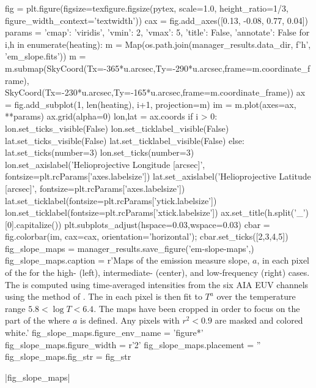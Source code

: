 \begin{pycode}
fig = plt.figure(figsize=texfigure.figsize(pytex, scale=1.0, height_ratio=1/3,
                                           figure_width_context='textwidth'))
cax = fig.add_axes([0.13, -0.08, 0.77, 0.04])
params = {'cmap': 'viridis', 'vmin': 2, 'vmax': 5, 'title': False, 'annotate': False}
for i,h in enumerate(heating):
    m = Map(os.path.join(manager_results.data_dir, f'{h}', 'em_slope.fits'))
    m = m.submap(SkyCoord(Tx=-365*u.arcsec,Ty=-290*u.arcsec,frame=m.coordinate_frame),
                 SkyCoord(Tx=-230*u.arcsec,Ty=-165*u.arcsec,frame=m.coordinate_frame))
    ax = fig.add_subplot(1, len(heating), i+1, projection=m)
    im = m.plot(axes=ax, **params)
    ax.grid(alpha=0)
    lon,lat = ax.coords
    if i > 0:
        lon.set_ticks_visible(False)
        lon.set_ticklabel_visible(False)
        lat.set_ticks_visible(False)
        lat.set_ticklabel_visible(False)
    else:
        lat.set_ticks(number=3)
        lon.set_ticks(number=3)
        lon.set_axislabel('Helioprojective Longitude [arcsec]',
                          fontsize=plt.rcParams['axes.labelsize'])
        lat.set_axislabel('Helioprojective Latitude [arcsec]',
                          fontsize=plt.rcParams['axes.labelsize'])
        lat.set_ticklabel(fontsize=plt.rcParams['ytick.labelsize'])
        lon.set_ticklabel(fontsize=plt.rcParams['xtick.labelsize'])
    ax.set_title(h.split('_')[0].capitalize())
plt.subplots_adjust(hspace=0.03,wspace=0.03)
cbar = fig.colorbar(im, cax=cax, orientation='horizontal');
cbar.set_ticks([2,3,4,5])
fig_slope_maps = manager_results.save_figure('em-slope-maps',)
fig_slope_maps.caption = r'Maps of the emission measure slope, $a$, in each pixel of the \AR{} for the high- (left), intermediate- (center), and low-frequency (right) cases. The \dem{} is computed using time-averaged intensities from the six AIA EUV channels using the method of \citet{hannah_differential_2012}. The \dem{} in each pixel is then fit to $T^a$ over the temperature range $5.8<\log{T}<6.4$. The maps have been cropped in order to focus on the part of the \AR{} where $a$ is defined. Any pixels with $r^2<0.9$ are masked and colored white.'
fig_slope_maps.figure_env_name = 'figure*'
fig_slope_maps.figure_width = r'2\columnwidth'
fig_slope_maps.placement = ''
fig_slope_maps.fig_str = fig_str
\end{pycode}
|fig_slope_maps|

